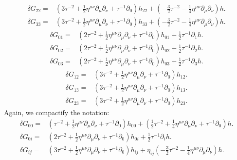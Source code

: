 \documentclass[10pt,letterpaper]{article}
\begin{document}
\begin{align}
\delta G_{22}={}&(3 \tau^{-2}
 + \tfrac{1}{2} \eta^{\mu \nu} \partial_{\mu} \partial_{\nu}
 + \tau^{-1} \partial_{0}) h_{22}
 + (- \tfrac{3}{2} \tau^{-2}
 -  \tfrac{1}{4} \eta^{\mu \nu} \partial_{\mu} \partial_{\nu}) h.
\end{align}
\begin{align}
\delta G_{33}={}&(3 \tau^{-2}
 + \tfrac{1}{2} \eta^{\mu \nu} \partial_{\mu} \partial_{\nu}
 + \tau^{-1} \partial_{0}) h_{33}
 + (- \tfrac{3}{2} \tau^{-2}
 -  \tfrac{1}{4} \eta^{\mu \nu} \partial_{\mu} \partial_{\nu}) h.
\end{align}
\begin{align}
\delta G_{01}={}&(2 \tau^{-2}
 + \tfrac{1}{2} \eta^{\mu \nu} \partial_{\mu} \partial_{\nu}
 + \tau^{-1} \partial_{0}) h_{01}
 + \tfrac{1}{2} \tau^{-1} \partial_{1} h.
\end{align}
\begin{align}
\delta G_{02}={}&(2 \tau^{-2}
 + \tfrac{1}{2} \eta^{\mu \nu} \partial_{\mu} \partial_{\nu}
 + \tau^{-1} \partial_{0}) h_{02}
 + \tfrac{1}{2} \tau^{-1} \partial_{2} h.
\end{align}
\begin{align}
\delta G_{03}={}&(2 \tau^{-2}
 + \tfrac{1}{2} \eta^{\mu \nu} \partial_{\mu} \partial_{\nu}
 + \tau^{-1} \partial_{0}) h_{03}
 + \tfrac{1}{2} \tau^{-1} \partial_{3} h.
\end{align}
\begin{align}
\delta G_{12}={}&(3 \tau^{-2}
 + \tfrac{1}{2} \eta^{\mu \nu} \partial_{\mu} \partial_{\nu}
 + \tau^{-1} \partial_{0}) h_{12}.
\end{align}
\begin{align}
\delta G_{13}={}&(3 \tau^{-2}
 + \tfrac{1}{2} \eta^{\mu \nu} \partial_{\mu} \partial_{\nu}
 + \tau^{-1} \partial_{0}) h_{13}.
\end{align}
\begin{align}
\delta G_{23}={}&(3 \tau^{-2}
 + \tfrac{1}{2} \eta^{\mu \nu} \partial_{\mu} \partial_{\nu}
 + \tau^{-1} \partial_{0}) h_{23}.
\end{align}
Again, we compactify the notation:
\begin{align}
\delta G_{00}={}&(\tau^{-2}
 + \tfrac{1}{2} \eta^{\mu \nu} \partial_{\mu} \partial_{\nu}
 + \tau^{-1} \partial_{0}) h_{00}
 + (\tfrac{1}{2} \tau^{-2}
 + \tfrac{1}{4} \eta^{\mu \nu} \partial_{\mu} \partial_{\nu}
 + \tau^{-1} \partial_{0}) h.
\\
\delta G_{0i}={}&(2 \tau^{-2}
 + \tfrac{1}{2} \eta^{\mu \nu} \partial_{\mu} \partial_{\nu}
 + \tau^{-1} \partial_{0}) h_{0i}
 + \tfrac{1}{2} \tau^{-1} \partial_{i} h.
\\
 \delta G_{ij}={}&(3 \tau^{-2}
 + \tfrac{1}{2} \eta^{\mu \nu} \partial_{\mu} \partial_{\nu}
 + \tau^{-1} \partial_{0}) h_{ij}
 + \eta_{ij}(- \tfrac{3}{2} \tau^{-2}
 -  \tfrac{1}{4} \eta^{\mu \nu} \partial_{\mu} \partial_{\nu}) h.
\end{align}
\end{document}

